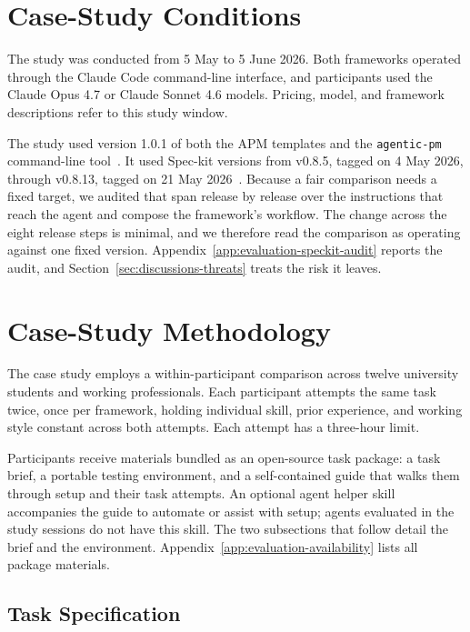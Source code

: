 \section{Case-Study Conditions}
\label{sec:evaluation-case-study-conditions}

The study was conducted from 5 May to 5 June 2026. Both frameworks operated through the Claude Code command-line interface, and participants used the Claude Opus 4.7 or Claude Sonnet 4.6 models. Pricing, model, and framework descriptions refer to this study window.

The study used version 1.0.1 of both the APM templates and the \texttt{agentic-pm} command-line tool~\cite{chaidemenos2026apm101,chaidemenos2026agenticpm101}. It used Spec-kit versions from v0.8.5, tagged on 4 May 2026, through v0.8.13, tagged on 21 May 2026~\cite{github2026speckitreleases}. Because a fair comparison needs a fixed target, we audited that span release by release over the instructions that reach the agent and compose the framework's workflow. The change across the eight release steps is minimal, and we therefore read the comparison as operating against one fixed version. Appendix~\ref{app:evaluation-speckit-audit} reports the audit, and Section~\ref{sec:discussions-threats} treats the risk it leaves.

\section{Case-Study Methodology}
\label{sec:evaluation-case-study-methodology}

The case study employs a within-participant comparison across twelve university students and working professionals. Each participant attempts the same task twice, once per framework, holding individual skill, prior experience, and working style constant across both attempts. Each attempt has a three-hour limit.

Participants receive materials bundled as an open-source task package: a task brief, a portable testing environment, and a self-contained guide that walks them through setup and their task attempts. An optional agent helper skill accompanies the guide to automate or assist with setup; agents evaluated in the study sessions do not have this skill. The two subsections that follow detail the brief and the environment. Appendix~\ref{app:evaluation-availability} lists all package materials.

\subsection{Task Specification}
\label{sec:evaluation-task-specification}

